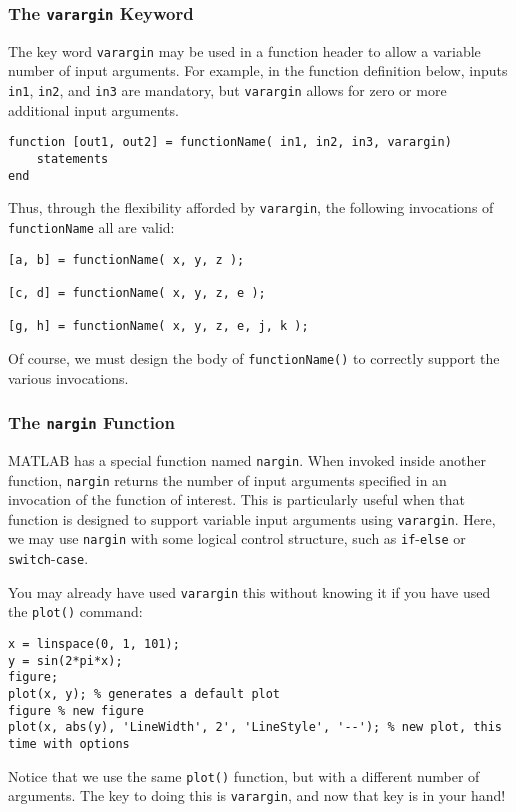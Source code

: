 \subsubsection{The \texttt{varargin} Keyword}
The key word \texttt{varargin} may be used in a function header to allow a variable number of input arguments. For example, in the function definition below, inputs \texttt{in1}, \texttt{in2}, and \texttt{in3} are mandatory, but \texttt{varargin} allows for zero or more additional input arguments.
\begin{lstlisting}[style=Matlab-editor]
function [out1, out2] = functionName( in1, in2, in3, varargin)
	statements
end
\end{lstlisting}
Thus, through the flexibility afforded by \texttt{varargin}, the following invocations of \texttt{functionName} all are valid:
\begin{lstlisting}[style=Matlab-editor]
[a, b] = functionName( x, y, z );

[c, d] = functionName( x, y, z, e );

[g, h] = functionName( x, y, z, e, j, k );
\end{lstlisting}
Of course, we must design the body of \texttt{functionName()} to correctly support the various invocations.

\subsubsection{The \texttt{nargin} Function}
MATLAB has a special function named \texttt{nargin}. When invoked inside another function, \texttt{nargin} returns the number of input arguments specified in an invocation of the function of interest. This is particularly useful when that function is designed to support variable input arguments using \texttt{varargin}. Here, we may use \texttt{nargin} with some logical control structure, such as \texttt{if}-\texttt{else} or \texttt{switch}-\texttt{case}.

You may already have used \texttt{varargin} this without knowing it if you have used the \texttt{plot()} command:
\begin{lstlisting}[style=Matlab-editor]
x = linspace(0, 1, 101);
y = sin(2*pi*x);
figure;
plot(x, y); % generates a default plot
figure % new figure
plot(x, abs(y), 'LineWidth', 2', 'LineStyle', '--'); % new plot, this time with options
\end{lstlisting}
Notice that we use the same \texttt{plot()} function, but with a different number of arguments. The key to doing this is \texttt{varargin}, and now that key is in your hand!

